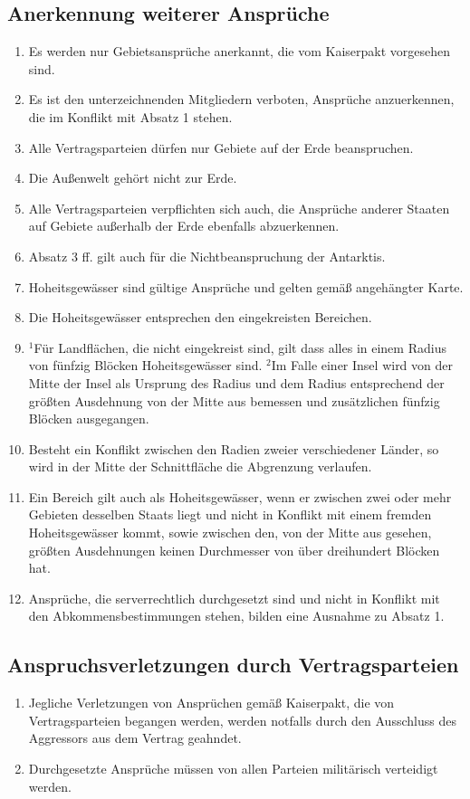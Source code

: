 \documentclass{article}
\begin{document}
\subsection{Anerkennung weiterer Ansprüche}
\begin{enumerate}[(1)]
    \item Es werden nur Gebietsansprüche anerkannt, die vom Kaiserpakt vorgesehen sind.
    \item Es ist den unterzeichnenden Mitgliedern verboten, Ansprüche anzuerkennen, die im Konflikt mit Absatz 1 stehen.
    \item Alle Vertragsparteien dürfen nur Gebiete auf der Erde beanspruchen.
    \item Die Außenwelt gehört nicht zur Erde.
    \item Alle Vertragsparteien verpflichten sich auch, die Ansprüche anderer Staaten auf Gebiete außerhalb der Erde ebenfalls abzuerkennen.
    \item Absatz 3 ff. gilt auch für die Nichtbeanspruchung der Antarktis.
    \item Hoheitsgewässer sind gültige Ansprüche und gelten gemäß angehängter Karte.
    \item Die Hoheitsgewässer entsprechen den eingekreisten Bereichen.
    \item ${^1}$Für Landflächen, die nicht eingekreist sind, gilt dass alles in einem Radius von fünfzig Blöcken Hoheitsgewässer sind. ${^2}$Im Falle einer Insel wird von der Mitte der Insel als Ursprung des Radius und dem Radius entsprechend der größten Ausdehnung von der Mitte aus bemessen und zusätzlichen fünfzig Blöcken ausgegangen.
    \item Besteht ein Konflikt zwischen den Radien zweier verschiedener Länder, so wird in der Mitte der Schnittfläche die Abgrenzung verlaufen.
    \item Ein Bereich gilt auch als Hoheitsgewässer, wenn er zwischen zwei oder mehr Gebieten desselben Staats liegt und nicht in Konflikt mit einem fremden Hoheitsgewässer kommt, sowie zwischen den, von der Mitte aus gesehen, größten Ausdehnungen keinen Durchmesser von über dreihundert Blöcken hat. 
    \item Ansprüche, die serverrechtlich durchgesetzt sind und nicht in Konflikt mit den Abkommensbestimmungen stehen, bilden eine Ausnahme zu Absatz 1.
\end{enumerate}

\subsection{Anspruchsverletzungen durch Vertragsparteien}
\begin{enumerate}[(1)]
    \item Jegliche Verletzungen von Ansprüchen gemäß Kaiserpakt, die von Vertragsparteien begangen werden, werden notfalls durch den Ausschluss des Aggressors aus dem Vertrag geahndet.
    \item Durchgesetzte Ansprüche müssen von allen Parteien militärisch verteidigt werden.
\end{enumerate}
\end{document}

